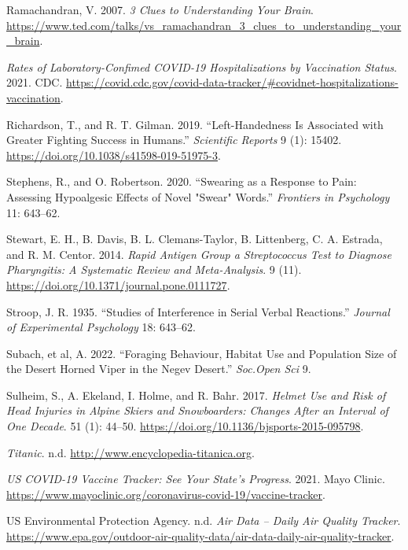 \documentclass[
]{report}
\newlength{\cslhangindent}
\newenvironment{CSLReferences}[2] %
 {\begin{list}{}{%
  \setlength{\itemindent}{0pt}
  \setlength{\leftmargin}{0pt}
  \setlength{\parsep}{0pt}
  \ifodd #1
   \setlength{\leftmargin}{\cslhangindent}
   \setlength{\itemindent}{-1\cslhangindent}
  \fi
  \setlength{\itemsep}{#2\baselineskip}}}
 {\end{list}}
\begin{document}
\begin{CSLReferences}{1}{1}
Ramachandran, V. 2007. \emph{3 Clues to Understanding Your Brain}. \url{https://www.ted.com/talks/vs_ramachandran_3_clues_to_understanding_your_brain}.

\emph{Rates of Laboratory-Confimed COVID-19 Hospitalizations by Vaccination Status}. 2021. CDC. \url{https://covid.cdc.gov/covid-data-tracker/\#covidnet-hospitalizations-vaccination}.

Richardson, T., and R. T. Gilman. 2019. {``Left-Handedness Is Associated with Greater Fighting Success in Humans.''} \emph{Scientific Reports} 9 (1): 15402. \url{https://doi.org/10.1038/s41598-019-51975-3}.

Stephens, R., and O. Robertson. 2020. {``Swearing as a Response to Pain: Assessing Hypoalgesic Effects of Novel "Swear" Words.''} \emph{Frontiers in Psychology} 11: 643--62.

Stewart, E. H., B. Davis, B. L. Clemans-Taylor, B. Littenberg, C. A. Estrada, and R. M. Centor. 2014. \emph{Rapid Antigen Group a Streptococcus Test to Diagnose Pharyngitis: A Systematic Review and Meta-Analysis}. 9 (11). \url{https://doi.org/10.1371/journal.pone.0111727}.

Stroop, J. R. 1935. {``Studies of Interference in Serial Verbal Reactions.''} \emph{Journal of Experimental Psychology} 18: 643--62.

{Subach, et al, A.} 2022. {``Foraging Behaviour, Habitat Use and Population Size of the Desert Horned Viper in the Negev Desert.''} \emph{Soc.Open Sci} 9.

Sulheim, S., A. Ekeland, I. Holme, and R. Bahr. 2017. \emph{Helmet Use and Risk of Head Injuries in Alpine Skiers and Snowboarders: Changes After an Interval of One Decade}. 51 (1): 44--50. \url{https://doi.org/10.1136/bjsports-2015-095798}.

\emph{Titanic}. n.d. \url{http://www.encyclopedia-titanica.org}.

\emph{US COVID-19 Vaccine Tracker: See Your State's Progress}. 2021. Mayo Clinic. \url{https://www.mayoclinic.org/coronavirus-covid-19/vaccine-tracker}.

US Environmental Protection Agency. n.d. \emph{Air Data -- Daily Air Quality Tracker}. \url{https://www.epa.gov/outdoor-air-quality-data/air-data-daily-air-quality-tracker}.


\end{CSLReferences}
\end{document}
